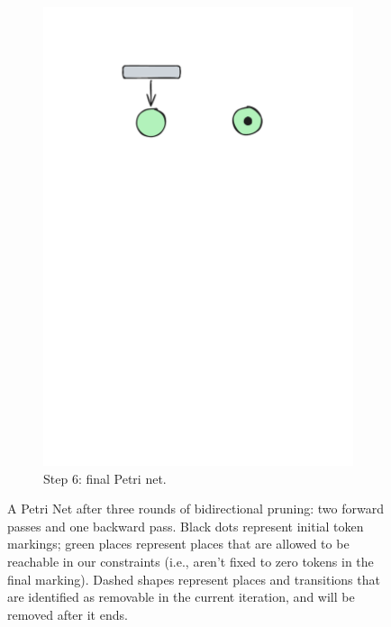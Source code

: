 \begin{figure}[!htbp]
\begin{subfigure}[b][\subfigheight][b]{0.23\textwidth}
		\includegraphics[width=\textwidth]{plots/bidirectional_pruning_step_e_updated_2.pdf}
		\caption{Step 6: final Petri net.}
		\label{fig:step:e}
	\end{subfigure}
	
	\caption{A Petri Net after three rounds of bidirectional pruning: two forward passes and one backward pass. Black dots represent initial token markings; green places represent places that are allowed to be reachable in our constraints (i.e., aren't fixed to zero tokens in the final marking). Dashed shapes represent places and transitions that are identified as removable in the current iteration, and will be removed after it ends.}
	\label{fig:bidirectional_pruning}
\end{figure}

